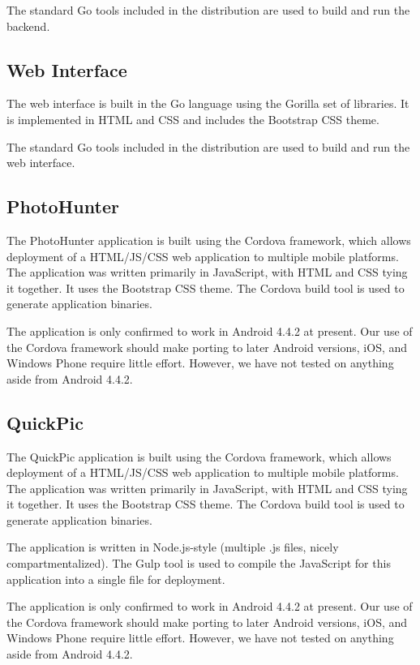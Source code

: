 \documentclass{article}
\begin{document}
The standard Go tools included in the distribution are used to build and run
the backend.

\subsection{Web Interface}

The web interface is built in the Go language using the Gorilla set of
libraries. It is implemented in HTML and CSS and includes the
Bootstrap CSS theme.

The standard Go tools included in the distribution are used to build and run
the web interface.

\subsection{PhotoHunter}

The PhotoHunter application is built using the Cordova framework,
which allows deployment of a HTML/JS/CSS web application to multiple mobile
platforms. The application was written primarily in JavaScript, with HTML and
CSS tying it together. It uses the Bootstrap CSS theme. The Cordova build tool
is used to generate application binaries.

The application is only confirmed to work in Android 4.4.2 at present. Our use
of the Cordova framework should make porting to later Android versions, iOS,
and Windows Phone require little effort. However, we have not tested on
anything aside from Android 4.4.2.

\subsection{QuickPic}

The QuickPic application is built using the Cordova framework,
which allows deployment of a HTML/JS/CSS web application to multiple mobile
platforms. The application was written primarily in JavaScript, with HTML and
CSS tying it together. It uses the Bootstrap CSS theme. The Cordova build tool is used to generate application
binaries.

The application is written in Node.js-style (multiple .js files, nicely
compartmentalized). The Gulp tool is used to compile the JavaScript
for this application into a single file for deployment.

The application is only confirmed to work in Android 4.4.2 at present. Our use
of the Cordova framework should make porting to later Android versions, iOS,
and Windows Phone require little effort. However, we have not tested on
anything aside from Android 4.4.2.
\end{document}
